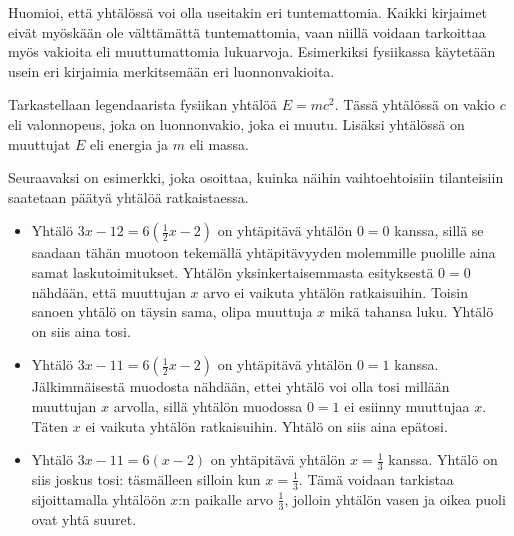 Huomioi, että yhtälössä voi olla useitakin eri tuntemattomia. Kaikki kirjaimet eivät myöskään ole välttämättä tuntemattomia, vaan niillä voidaan tarkoittaa myös vakioita eli muuttumattomia lukuarvoja. Esimerkiksi fysiikassa käytetään usein eri kirjaimia merkitsemään eri luonnonvakioita.


\begin{esimerkki}
 Tarkastellaan legendaarista fysiikan yhtälöä $E=mc^2$. Tässä yhtälössä on vakio $c$ eli valonnopeus, joka on luonnonvakio, joka ei muutu. Lisäksi yhtälössä on muuttujat $E$ eli energia ja $m$ eli massa.
\end{esimerkki}

Seuraavaksi on esimerkki, joka osoittaa, kuinka näihin vaihtoehtoisiin tilanteisiin saatetaan päätyä yhtälöä ratkaistaessa.




\begin{esimerkki}
	\begin{itemize}
		\item{Yhtälö $3x-12=6(\frac{1}{2}x-2)$ on yhtäpitävä yhtälön $0=0$ kanssa, sillä se saadaan tähän muotoon 
		tekemällä yhtäpitävyyden molemmille puolille aina samat laskutoimitukset. Yhtälön yksinkertaisemmasta esityksestä $0=0$ nähdään, että muuttujan $x$ 
		arvo ei vaikuta yhtälön ratkaisuihin. Toisin sanoen yhtälö on täysin sama, olipa muuttuja $x$ mikä tahansa luku. Yhtälö on siis aina tosi.}
		\item{Yhtälö $3x-11=6(\frac{1}{2}x-2)$ on yhtäpitävä yhtälön $0=1$ kanssa. Jälkimmäisestä muodosta nähdään, ettei yhtälö voi olla tosi millään
		muuttujan $x$ arvolla, sillä yhtälön muodossa $0=1$ ei esiinny muuttujaa $x$. Täten $x$ ei vaikuta yhtälön ratkaisuihin. 
		Yhtälö on siis aina epätosi.}
		\item{Yhtälö $3x-11=6(x-2)$ on yhtäpitävä yhtälön $x=\frac{1}{3}$ kanssa. Yhtälö on siis joskus tosi: täsmälleen silloin kun $x=\frac{1}{3}$.
		Tämä voidaan tarkistaa sijoittamalla yhtälöön $x$:n paikalle arvo $\frac{1}{3}$, jolloin yhtälön vasen ja oikea puoli ovat yhtä suuret.}
	\end{itemize}

\end{esimerkki}


